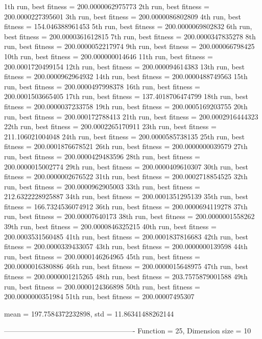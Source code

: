 1th run, best fitness = 200.0000062975773
2th run, best fitness = 200.0000227395601
3th run, best fitness = 200.0000086802809
4th run, best fitness = 154.046388961453
5th run, best fitness = 200.0000069802832
6th run, best fitness = 200.0000361612815
7th run, best fitness = 200.0000347835278
8th run, best fitness = 200.0000052217974
9th run, best fitness = 200.000066798425
10th run, best fitness = 200.000000014646
11th run, best fitness = 200.0001720499154
12th run, best fitness = 200.000094614383
13th run, best fitness = 200.0000962964932
14th run, best fitness = 200.0000488749563
15th run, best fitness = 200.0000497998378
16th run, best fitness = 200.0001503665405
17th run, best fitness = 137.4018706474799
18th run, best fitness = 200.0000037233758
19th run, best fitness = 200.0005169203755
20th run, best fitness = 200.000172788413
21th run, best fitness = 200.0002916444323
22th run, best fitness = 200.0002265170911
23th run, best fitness = 211.106021004048
24th run, best fitness = 200.0000585738135
25th run, best fitness = 200.0001876678521
26th run, best fitness = 200.0000000039579
27th run, best fitness = 200.0000429483596
28th run, best fitness = 200.0000015002774
29th run, best fitness = 200.0000409610307
30th run, best fitness = 200.0000002676522
31th run, best fitness = 200.0002718854525
32th run, best fitness = 200.0000962905003
33th run, best fitness = 212.6322228925887
34th run, best fitness = 200.0001351295139
35th run, best fitness = 166.7324536074912
36th run, best fitness = 200.0000694119278
37th run, best fitness = 200.00007640173
38th run, best fitness = 200.0000001558262
39th run, best fitness = 200.0000846325215
40th run, best fitness = 200.0003531560485
41th run, best fitness = 200.0001837816683
42th run, best fitness = 200.0000339433057
43th run, best fitness = 200.0000000139598
44th run, best fitness = 200.0000146264965
45th run, best fitness = 200.0000016380886
46th run, best fitness = 200.0000015648975
47th run, best fitness = 200.0000001215265
48th run, best fitness = 203.7575879001588
49th run, best fitness = 200.0000124366898
50th run, best fitness = 200.0000000351984
51th run, best fitness = 200.00007495307

mean = 197.7584372232898, std = 11.86341488262144

-------------------------------------------------------
Function = 25, Dimension size = 10

